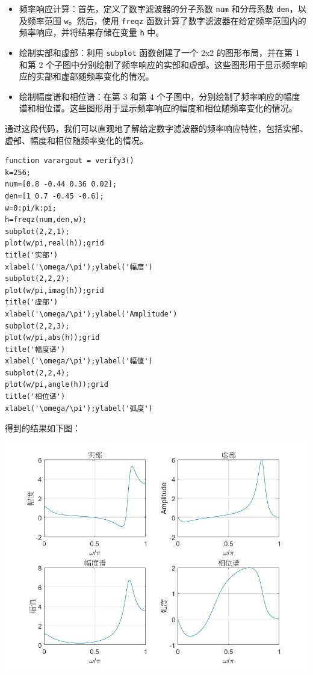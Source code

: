 \documentclass[a4paper,12pt]{article}
\begin{document}
\begin{itemize}
    \item 频率响应计算：首先，定义了数字滤波器的分子系数 \texttt{num} 和分母系数 \texttt{den}，以及频率范围 \texttt{w}。然后，使用 \texttt{freqz} 函数计算了数字滤波器在给定频率范围内的频率响应，并将结果存储在变量 \texttt{h} 中。
    
    \item 绘制实部和虚部：利用 \texttt{subplot} 函数创建了一个 2x2 的图形布局，并在第 1 和第 2 个子图中分别绘制了频率响应的实部和虚部。这些图形用于显示频率响应的实部和虚部随频率变化的情况。
    
    \item 绘制幅度谱和相位谱：在第 3 和第 4 个子图中，分别绘制了频率响应的幅度谱和相位谱。这些图形用于显示频率响应的幅度和相位随频率变化的情况。
\end{itemize}

通过这段代码，我们可以直观地了解给定数字滤波器的频率响应特性，包括实部、虚部、幅度和相位随频率变化的情况。

\begin{lstlisting}
function varargout = verify3()
k=256; 
num=[0.8 -0.44 0.36 0.02]; 
den=[1 0.7 -0.45 -0.6]; 
w=0:pi/k:pi;
h=freqz(num,den,w); 
subplot(2,2,1); 
plot(w/pi,real(h));grid 
title('实部') 
xlabel('\omega/\pi');ylabel('幅度') 
subplot(2,2,2); 
plot(w/pi,imag(h));grid 
title('虚部') 
xlabel('\omega/\pi');ylabel('Amplitude') 
subplot(2,2,3); 
plot(w/pi,abs(h));grid 
title('幅度谱') 
xlabel('\omega/\pi');ylabel('幅值') 
subplot(2,2,4); 
plot(w/pi,angle(h));grid 
title('相位谱') 
xlabel('\omega/\pi');ylabel('弧度')
\end{lstlisting}

得到的结果如下图：

\centering 
\includegraphics[width=0.8\linewidth]{images/3_Verify/verify3.jpg}
\justifying
\end{document}
